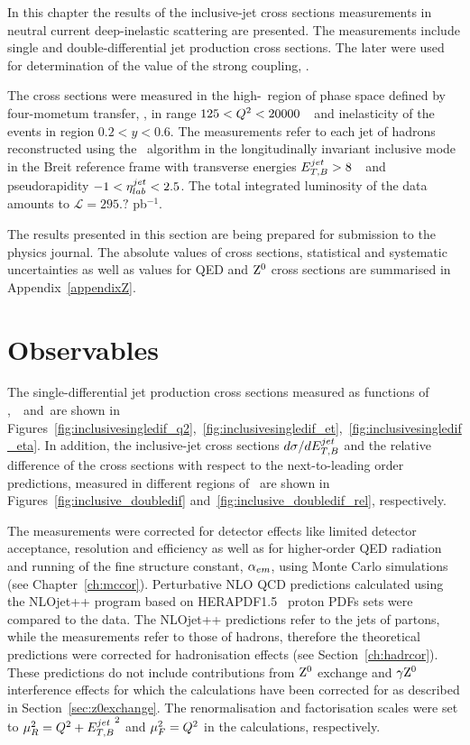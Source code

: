 In this chapter the results of the inclusive-jet cross sections measurements in neutral current deep-inelastic scattering are presented. The measurements include single and double-differential jet production cross sections. The later were used for determination of the value of the strong coupling, \asz. 

The cross sections were measured in the high-\qsq~region of phase space defined by four-mometum transfer, \qsq, in range $125 < \mbox{${Q^2}$} < 20000$~\GeV~and inelasticity of the events in region $0.2<y<0.6$. The measurements refer to each jet of hadrons reconstructed using the \kt\, algorithm in the longitudinally invariant inclusive mode in the Breit reference frame with transverse energies $\mbox{$E_{T,B}^{jet}$} > 8$~\GeV~and pseudorapidity $-1<\mbox{$\eta^{jet}_{lab}$}<2.5$. The total integrated luminosity of the data amounts to $\mathcal{L}=295.?$ pb$^{-1}$.

The results presented in this section are being prepared for submission to the physics journal. The absolute values of cross sections, statistical and systematic uncertainties as well as values for QED and $\mbox{$\rm{Z}^0$}$ cross sections are summarised in Appendix~\ref{appendixZ}.

\section{Observables}
The single-differential jet production cross sections measured as functions of \qsq,~\etjetb~and~\etajetlab are shown in Figures~\ref{fig:inclusivesingledif_q2},~\ref{fig:inclusivesingledif_et},~\ref{fig:inclusivesingledif_eta}. In addition, the inclusive-jet cross sections $\mbox{$d\sigma/dE_{T,B}^{jet}$}$ and the relative difference of the cross sections with respect to the next-to-leading order predictions, measured in different regions of \qsq~are shown in Figures~\ref{fig:inclusive_doubledif} and~\ref{fig:inclusive_doubledif_rel}, respectively.

The measurements were corrected for detector effects like limited detector acceptance, resolution and efficiency as well as for higher-order QED radiation and running of the fine structure constant, $\mbox{$\alpha_{em}$}$, using Monte Carlo simulations (see Chapter~\ref{ch:mccor}). Perturbative NLO QCD predictions calculated using the NLOjet++ program based on HERAPDF1.5~\cite{herapdf} proton PDFs sets were compared to the data. The NLOjet++ predictions refer to the jets of partons, while the measurements refer to those of hadrons, therefore the theoretical predictions were corrected for hadronisation effects (see Section~\ref{ch:hadrcor}). These predictions do not include contributions from $\mbox{$\rm{Z}^0$}$ exchange and $\gamma\mbox{$\rm{Z}^0$}$ interference effects for which the calculations have been corrected for as described in Section~\ref{sec:z0exchange}. The renormalisation and factorisation scales were set to $\mu_R^2 = \mbox{${Q^2}$} + \mbox{$E_{T,B}^{jet}$}^2$ and $\mu_F^2 = \mbox{${Q^2}$}$ in the calculations, respectively.

